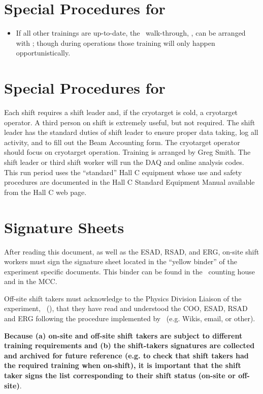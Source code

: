 %
\newpage
\section{Special Procedures for \HALL}

\begin{itemize}

\item{
If all other trainings are up-to-date, the \HALL\ walk-through, \AWARENESS, can be arranged 
with {\WALKTHROUGHTRAINER}; 
though during operations those training will only 
happen opportunistically.   
}
\end{itemize}

%
\newpage
\section{Special Procedures for \EXPTS}

Each shift requires a shift leader and, if the cryotarget is cold, a cryotarget 
operator.  A third person on shift is extremely useful, but not required. The shift leader 
has the standard
duties of shift leader to ensure proper data taking, log all activity, and to fill out
the Beam Accounting form. The cryotarget operator should focus on cryotarget
operation. Training is arranged by Greg Smith. The shift leader or third
shift worker will run the DAQ and online analysis codes.
This run period uses the ``standard'' Hall C equipment whose
use and safety procedures are documented in the Hall C Standard Equipment
Manual available from the Hall C web page.


\newpage
\section{Signature Sheets}

After reading this document, as well as the ESAD, RSAD, and ERG, on-site shift workers must sign
the signature sheet located in the ``yellow binder'' of the experiment specific documents.
This binder can be found in the \HALL\ counting house and in the MCC.

Off-site shift takers must acknowledge to the Physics Division Liaison of the experiment, \PHYSDIVLIAISON\ (\PHYSDIVLIAISONEMAIL),  that they have read and understood the COO, ESAD, RSAD and ERG following the procedure implemented by \HALL\ (e.g. Wikis, email, or other).

{\bf Because (a) on-site and off-site shift takers are subject to different training requirements and (b) the shift-takers signatures are collected and archived for future reference (e.g. to check that shift takers had the required training when on-shift), it is important that the shift taker signs the list corresponding to their shift status (on-site or off-site)}.
